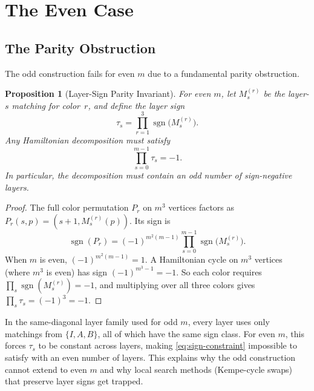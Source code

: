 \documentclass[11pt]{article}
\newtheorem{proposition}[theorem]{Proposition}
\theoremstyle{definition}
\theoremstyle{remark}
\newcommand{\sgn}{\operatorname{sgn}}
\begin{document}
\section{The Even Case}
\label{sec:even}

\subsection{The Parity Obstruction}

The odd construction fails for even $m$ due to a fundamental parity obstruction.

\begin{proposition}[Layer-Sign Parity Invariant]
\label{prop:sign}
For even $m$, let $M_s^{(r)}$ be the layer-$s$ matching for color~$r$, and define the layer sign
\begin{equation}
    \tau_s = \prod_{r=1}^{3} \sgn\bigl(M_s^{(r)}\bigr).
\end{equation}
Any Hamiltonian decomposition must satisfy
\begin{equation}
    \prod_{s=0}^{m-1} \tau_s = -1.
    \label{eq:sign-constraint}
\end{equation}
In particular, the decomposition must contain an odd number of sign-negative layers.
\end{proposition}

\begin{proof}
The full color permutation $P_r$ on $m^3$ vertices factors as $P_r(s, p) = (s+1, M_s^{(r)}(p))$. Its sign is
\begin{equation}
    \sgn(P_r) = (-1)^{m^2(m-1)} \prod_{s=0}^{m-1} \sgn\bigl(M_s^{(r)}\bigr).
\end{equation}
When $m$ is even, $(-1)^{m^2(m-1)} = 1$. A Hamiltonian cycle on $m^3$ vertices (where $m^3$ is even) has sign $(-1)^{m^3 - 1} = -1$. So each color requires $\prod_s \sgn(M_s^{(r)}) = -1$, and multiplying over all three colors gives $\prod_s \tau_s = (-1)^3 = -1$.
\end{proof}

In the same-diagonal layer family used for odd $m$, every layer uses only matchings from $\{I, A, B\}$, all of which have the same sign class. For even $m$, this forces $\tau_s$ to be constant across layers, making \eqref{eq:sign-constraint} impossible to satisfy with an even number of layers. This explains why the odd construction cannot extend to even $m$ and why local search methods (Kempe-cycle swaps) that preserve layer signs get trapped.
\end{document}
